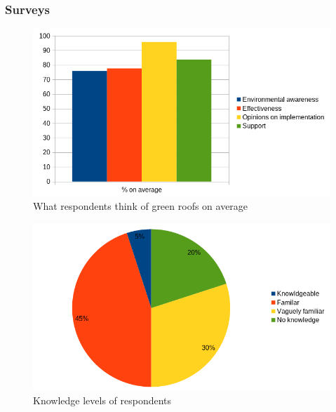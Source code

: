 \documentclass[a4paper]{article}
\begin{document}
\begin{multicols}{2}
  \subsubsection{Surveys}

  \begin{figure}[H]
    \centering
    \includegraphics[width=\linewidth]{responses-ave.png}
    \caption{What respondents think of green roofs on average}
    \label{fig:surv-resp}
  \end{figure}

  \begin{figure}[H]
    \centering
    \includegraphics[width=\linewidth]{knowledge.png}
    \caption{Knowledge levels of respondents}
    \label{fig:know-levels}
  \end{figure}


\end{multicols}
\end{document}
